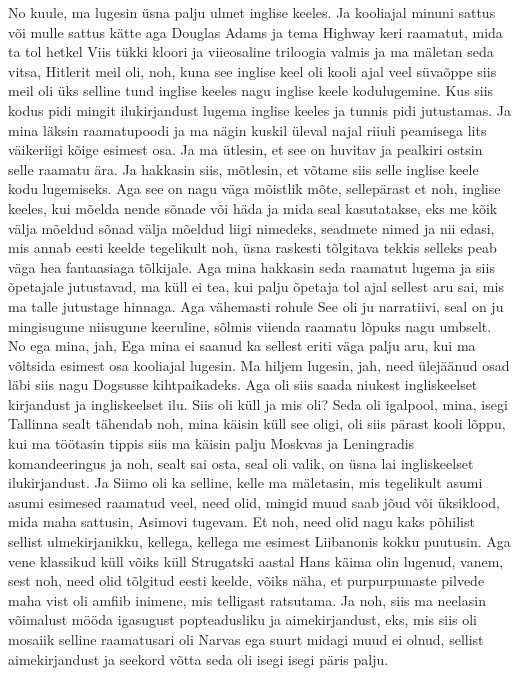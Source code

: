 No kuule, ma lugesin üsna palju ulmet inglise keeles. Ja kooliajal minuni sattus või mulle sattus kätte aga Douglas Adams ja tema Highway keri raamatut, mida ta tol hetkel
Viis tükki kloori ja viieosaline triloogia valmis ja ma mäletan seda vitsa, Hitlerit meil oli, noh, kuna see inglise keel oli kooli ajal veel süvaõppe siis meil oli üks selline tund inglise keeles nagu inglise keele kodulugemine. Kus siis kodus pidi mingit ilukirjandust lugema inglise keeles ja tunnis pidi jutustamas. Ja mina läksin raamatupoodi ja ma nägin kuskil üleval najal riiuli peamisega lits väikeriigi kõige esimest osa. Ja ma ütlesin, et see on huvitav ja pealkiri ostsin selle raamatu ära. Ja hakkasin siis, mõtlesin, et võtame siis selle inglise keele kodu lugemiseks. Aga see on nagu väga mõistlik mõte, sellepärast et noh, inglise keeles, kui mõelda nende sõnade või häda ja mida seal kasutatakse, eks me kõik välja mõeldud sõnad välja mõeldud liigi nimedeks, seadmete nimed ja nii edasi, mis annab eesti keelde tegelikult noh, üsna raskesti tõlgitava tekkis selleks peab väga hea fantaasiaga tõlkijale. Aga mina hakkasin seda raamatut lugema ja siis õpetajale jutustavad, ma küll ei tea, kui palju õpetaja tol ajal sellest aru sai, mis ma talle jutustage hinnaga. Aga vähemasti rohule
See oli ju narratiivi, seal on ju mingisugune niisugune keeruline, sõlmis viienda raamatu lõpuks nagu umbselt.
No ega mina, jah, Ega mina ei saanud ka sellest eriti väga palju aru, kui ma võltsida esimest osa kooliajal lugesin. Ma hiljem lugesin, jah, need ülejäänud osad läbi siis nagu Dogsusse kihtpaikadeks.
Aga oli siis saada niukest ingliskeelset kirjandust ja ingliskeelset ilu.
Siis oli küll ja mis oli? Seda oli igalpool, mina, isegi Tallinna sealt tähendab noh, mina käisin küll see oligi, oli siis pärast kooli lõppu, kui ma töötasin tippis siis ma käisin palju Moskvas ja Leningradis komandeeringus ja noh, sealt sai osta, seal oli valik, on üsna lai ingliskeelset ilukirjandust. Ja Siimo oli ka selline, kelle ma mäletasin, mis tegelikult asumi asumi esimesed raamatud veel, need olid, mingid muud saab jõud või üksiklood, mida maha sattusin, Asimovi tugevam. Et noh, need olid nagu kaks põhilist sellist ulmekirjanikku, kellega, kellega me esimest Liibanonis kokku puutusin. Aga vene klassikud küll võiks küll Strugatski aastal Hans käima olin lugenud, vanem, sest noh, need olid tõlgitud eesti keelde, võiks näha, et purpurpunaste pilvede maha vist oli amfiib inimene, mis telligast ratsutama. Ja noh, siis ma neelasin võimalust mööda igasugust popteadusliku ja aimekirjandust, eks, mis siis oli mosaiik selline raamatusari oli Narvas ega suurt midagi muud ei olnud, sellist aimekirjandust ja seekord võtta seda oli isegi isegi päris palju.
